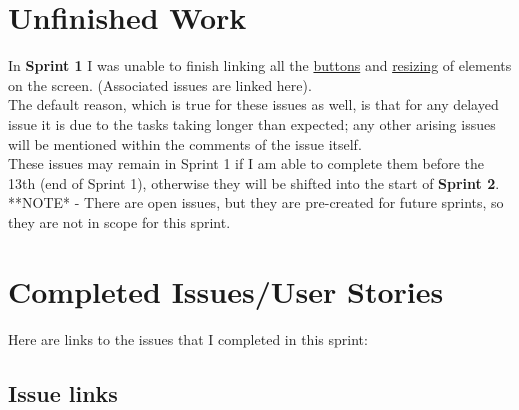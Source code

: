 \documentclass{article}
\begin{document}
\section{Unfinished Work}
\large{
In \textbf{Sprint 1} I was unable to finish linking all the \href{https://github.com/zachA214/Adelson_Senior_Capstone/issues/42}{buttons} and \href{https://github.com/zachA214/Adelson_Senior_Capstone/issues/43}{resizing} of elements on the screen. (Associated issues are linked here). \\
The default reason, which is true for these issues as well, is that for any delayed issue it is due to the tasks taking longer than expected; any other arising issues will be mentioned within the comments of the issue itself. \\
These issues may remain in Sprint 1 if I am able to complete them before the 13th (end of Sprint 1), otherwise they will be shifted into the start of \textbf{Sprint 2}.\\
**NOTE* - There are open issues, but they are pre-created for future sprints, so they are not in scope for this sprint. \\
}
\newpage
\section{Completed Issues/User Stories}
Here are links to the issues that I completed in this sprint:
\subsection{Issue links}
\end{document}
